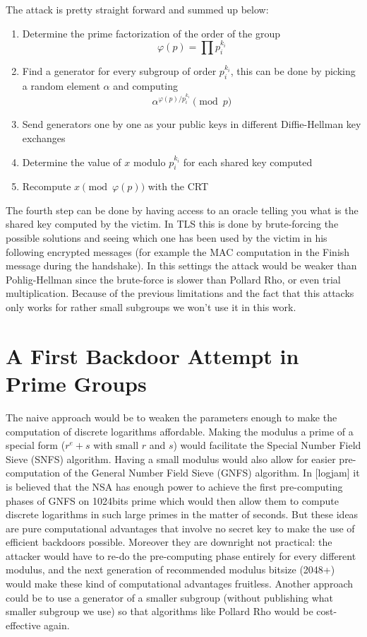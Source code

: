 \documentclass[a4paper,11pt,twocolumn]{article}
\begin{document}
The attack is pretty straight forward and summed up below:

\begin{enumerate}
    \item Determine the prime factorization of the order of the group
      $$\varphi(p) = \prod p_i^{k_i} $$
    \item Find a generator for every subgroup of order $p_i^{k_i}$, this can be done by picking a random element $\alpha$ and computing
      $$\alpha^{\varphi(p) / p_i^{k_i}} \pmod{p}$$
    \item Send generators one by one as your public keys in different Diffie-Hellman key exchanges
    \item Determine the value of $x$ modulo $p_i^{k_i}$ for each shared key computed
    \item Recompute $x \pmod{\varphi(p)}$ with the CRT
\end{enumerate}

The fourth step can be done by having access to an oracle telling you what is the shared key computed by the victim. In TLS this is done by brute-forcing the possible solutions and seeing which one has been used by the victim in his following encrypted messages (for example the MAC computation in the Finish message during the handshake). In this settings the attack would be weaker than Pohlig-Hellman since the brute-force is slower than Pollard Rho, or even trial multiplication. Because of the previous limitations and the fact that this attacks only works for rather small subgroups we won't use it in this work.

\section{A First Backdoor Attempt in Prime Groups}

The naive approach would be to weaken the parameters enough to make the computation of discrete logarithms affordable. Making the modulus a prime of a special form ($r^e + s$ with small $r$ and $s$) would facilitate the Special Number Field Sieve (SNFS) algorithm. Having a small modulus would also allow for easier pre-computation of the General Number Field Sieve (GNFS) algorithm. In [logjam] it is believed that the NSA has enough power to achieve the first pre-computing phases of GNFS on 1024bits prime which would then allow them to compute discrete logarithms in such large primes in the matter of seconds. But these ideas are pure computational advantages that involve no secret key to make the use of efficient backdoors possible. Moreover they are downright not practical: the attacker would have to re-do the pre-computing phase entirely for every different modulus, and the next generation of recommended modulus bitsize (2048+) would make these kind of computational advantages fruitless. Another approach could be to use a generator of a smaller subgroup (without publishing what smaller subgroup we use) so that algorithms like Pollard Rho would be cost-effective again.
\end{document}

